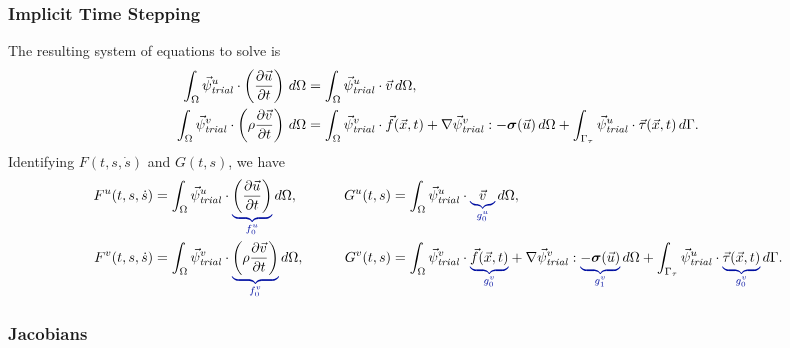 \subsubsection{Implicit Time Stepping}
The resulting system of equations to solve  is
\begin{align}
  \label{eqn:elasticity:velocity:implicit}
  \int_\Omega \trialvec[u] \cdot \left( \frac{\partial \vec{u}}{\partial t} \right) \, d\Omega 
&= 
  \int_\Omega \trialvec[u] \cdot \vec{v} \, d\Omega, \\
%
  \label{eqn:elasticity:displacement:implicit}
  \int_\Omega \trialvec[v] \cdot \left( \rho \frac{\partial \vec{v}}{\partial t} \right) \, 
d\Omega &=
  \int_\Omega \trialvec[v] \cdot \vec{f}(\vec{x},t) + \nabla \trialvec[v] : -\tensor{\sigma}
(\vec{u}) \, d\Omega + 
\int_{\Gamma_\tau} \trialvec[u] \cdot \vec{\tau}(\vec{x},t) \, d\Gamma.
\end{align}
Identifying $F(t,s,\dot{s})$ and $G(t,s)$, we have
\begin{alignat}{2}
  F^u(t,s,\dot{s}) &= \int_\Omega \trialvec[u] \cdot \eqnannotate{\left( \frac{\partial 
\vec{u}}{\partial t} 
\right)}{f_0^u} \, d\Omega,
  & \qquad
  G^u(t,s) &= \int_\Omega \trialvec[u] \cdot \eqnannotate{\vec{v}}{g_0^u} \, d\Omega, \\
  F^v(t,s,\dot{s}) &= \int_\Omega \trialvec[v] \cdot \eqnannotate{\left( \rho \frac{\partial 
\vec{v}}{\partial t} 
\right)}{f_0^v} \, d\Omega,
  & \qquad
  G^v(t,s) &= \int_\Omega \trialvec[v] \cdot \eqnannotate{\vec{f}(\vec{x},t)}{g_0^v} + \nabla 
\trialvec[v] : 
\eqnannotate{-\tensor{\sigma}(\vec{u})}{g_1^v} \, d\Omega + \int_{\Gamma_\tau} \trialvec[u] 
\cdot 
\eqnannotate{\vec{\tau}(\vec{x},t)}{g_0^v} \, d\Gamma.
\end{alignat}


\subsubsection{Jacobians}

